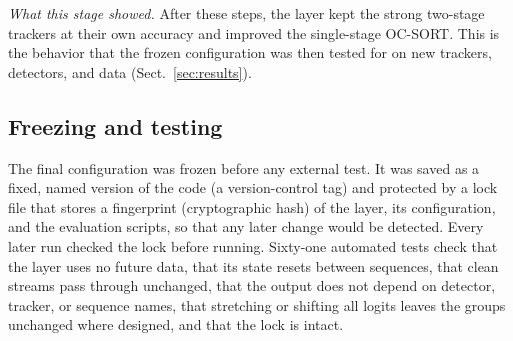 \emph{What this stage showed.} After these steps, the layer kept the strong
two-stage trackers at their own accuracy and improved the single-stage
OC-SORT. This is the behavior that the frozen configuration was then tested
for on new trackers, detectors, and data (Sect.~\ref{sec:results}).



\subsection{Freezing and testing}\label{sec:freeze}
The final configuration was frozen before any external test. It was saved as
a fixed, named version of the code (a version-control tag) and protected by a
lock file that stores a fingerprint (cryptographic hash) of the layer, its
configuration, and the evaluation scripts, so that any later change would be
detected. Every later run checked the lock before running. Sixty-one automated tests check
that the layer uses no future data, that its state resets between sequences,
that clean streams pass through unchanged, that the output does not depend on
detector, tracker, or sequence names, that stretching or shifting all logits
leaves the groups unchanged where designed, and that the lock is intact.
